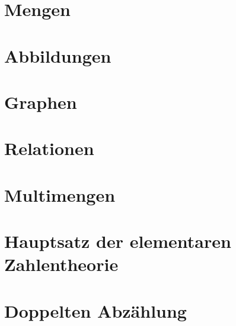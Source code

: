 \documentclass[a4paper,12pt, DIV12]{scrartcl}
\begin{document}

\newpage
\tableofcontents
\newpage
\section{Mengen}

\newpage


\newpage
\section{Abbildungen}

\newpage

\newpage

\newpage


\newpage
\section{Graphen}

\newpage

\newpage


\newpage
\section{Relationen}



%

\newpage

\section{Multimengen}


\newpage
\section{Hauptsatz der elementaren Zahlentheorie}


\newpage
\section{Doppelten Abzählung}

\end{document}
